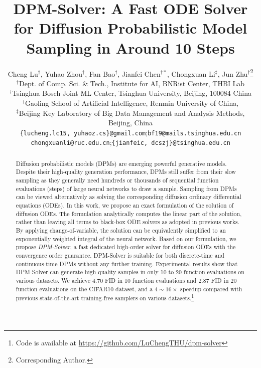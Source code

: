\documentclass{article}
\title{DPM-Solver: A Fast ODE Solver for Diffusion Probabilistic Model Sampling in Around 10 Steps}
\author{Cheng Lu$^\dag$, Yuhao Zhou$^\dag$, Fan Bao$^\dag$, Jianfei Chen$^{\dag*}$, Chongxuan Li$^\ddag$, Jun Zhu$^\dag$\thanks{Corresponding Author.} \\
$^\dag$Dept. of Comp. Sci. \& Tech., Institute for AI, BNRist Center, THBI Lab \\
$^\dag$Tsinghua-Bosch Joint ML Center, Tsinghua University, Beijing, 100084 China \\
$^\ddag$Gaoling School of Artificial Intelligence, Renmin University of China, \\
$^\ddag$Beijing Key Laboratory of Big Data Management and Analysis Methods, Beijing, China \\
\texttt{\{lucheng.lc15, yuhaoz.cs\}@gmail.com};\quad \texttt{bf19@mails.tsinghua.edu.cn} \\
\texttt{chongxuanli@ruc.edu.cn};\quad \texttt{\{jianfeic, dcszj\}@tsinghua.edu.cn} \\
}
\numberwithin{equation}{section}
\theoremstyle{plain}
\theoremstyle{definition}
\begin{document}
\maketitle


\begin{abstract}
Diffusion probabilistic models (DPMs) are emerging powerful generative models. Despite their high-quality generation performance, DPMs still suffer from their slow sampling as they generally need hundreds or thousands of sequential function evaluations (steps) of large neural networks to draw a sample. Sampling from DPMs can be viewed alternatively as solving the corresponding diffusion ordinary differential equations (ODEs). In this work, we propose an exact formulation of the solution of diffusion ODEs. The formulation analytically computes the linear part of the solution, rather than leaving all terms to black-box ODE solvers as adopted in previous works. By applying change-of-variable, the solution can be equivalently simplified to an exponentially weighted integral of the neural network. Based on our formulation, we propose \textit{DPM-Solver}, a fast dedicated high-order solver for diffusion ODEs with the convergence order guarantee. DPM-Solver is suitable for both discrete-time and continuous-time DPMs without any further training. Experimental results show that DPM-Solver can generate high-quality samples in only 10 to 20 function evaluations on various datasets. We achieve 4.70 FID in 10 function evaluations and 2.87 FID in 20 function evaluations on the CIFAR10 dataset, and a $4\sim 16\times$ speedup compared with previous state-of-the-art training-free samplers on various datasets.\footnote{Code is available at \url{https://github.com/LuChengTHU/dpm-solver}}




\end{abstract}

\doparttoc
\faketableofcontents







\end{document}
